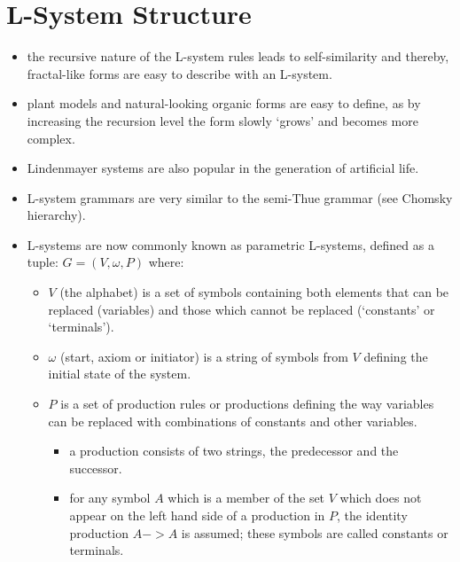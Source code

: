 \documentclass[11pt]{report}
\begin{document}
\section{L-System Structure}
\begin{itemize}
    \item the recursive nature of the L-system rules leads to self-similarity and
          thereby, fractal-like forms are easy to describe with an L-system.
    \item plant models and natural-looking organic forms are easy to define, as by
          increasing the recursion level the form slowly `grows' and becomes more
          complex.
    \item Lindenmayer systems are also popular in the generation of artificial life.
    \item L-system grammars are very similar to the semi-Thue grammar (see Chomsky
          hierarchy).
    \item L-systems are now commonly known as parametric L-systems, defined as a tuple:
          $G = (V, \omega, P)$ where:
          \begin{itemize}
              \item $V$ (the alphabet) is a set of symbols containing both elements that
                    can be replaced (variables) and those which cannot be replaced
                    (`constants' or `terminals').
              \item $\omega$ (start, axiom or initiator) is a string of symbols from $V$
                    defining the initial state of the system.
              \item $P$ is a set of production rules or productions defining the way
                    variables can be replaced with combinations of constants and other
                    variables.
                    \begin{itemize}
                        \item a production consists of two strings, the predecessor and
                              the successor.
                        \item for any symbol $A$ which is a member of the set $V$ which
                              does not appear on the left hand side of a production in
                              $P$, the identity production $A -> A$ is assumed; these
                              symbols are called constants or terminals.
                    \end{itemize}
          \end{itemize}

\end{itemize}
\end{document}
